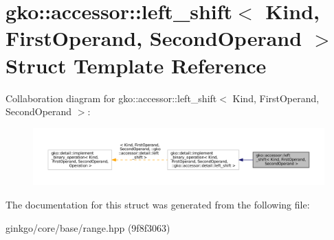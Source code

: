 \hypertarget{structgko_1_1accessor_1_1left__shift}{}\section{gko\+:\+:accessor\+:\+:left\+\_\+shift$<$ Kind, First\+Operand, Second\+Operand $>$ Struct Template Reference}
\label{structgko_1_1accessor_1_1left__shift}


Collaboration diagram for gko\+:\+:accessor\+:\+:left\+\_\+shift$<$ Kind, First\+Operand, Second\+Operand $>$\+:
\nopagebreak
\begin{figure}[H]
\begin{center}
\leavevmode
\includegraphics[width=350pt]{structgko_1_1accessor_1_1left__shift__coll__graph}
\end{center}
\end{figure}


The documentation for this struct was generated from the following file\+:\begin{DoxyCompactItemize}
\item 
ginkgo/core/base/range.\+hpp (9f8f3063)\end{DoxyCompactItemize}
